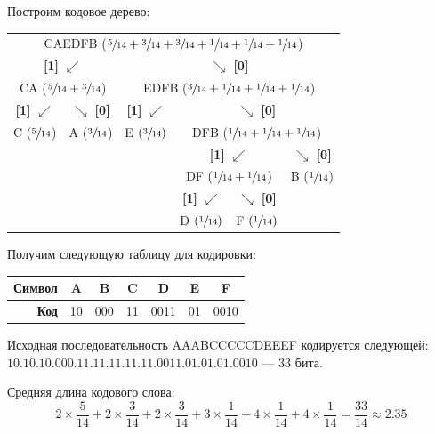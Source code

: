 \begin{example}
    Построим кодовое дерево:
    \begin{table}[H]
        \centering
        \begin{tabular}{cccccc}
        \multicolumn{6}{c}{CAEDFB ($\sfrac{5}{14} + \sfrac{3}{14} + \sfrac{3}{14} + \sfrac{1}{14} + \sfrac{1}{14} + \sfrac{1}{14}$)} \\
        \multicolumn{2}{c}{\textbf{[1]} $\swarrow$} & \multicolumn{4}{c}{$\searrow$ \textbf{[0]}} \\
        \multicolumn{2}{c}{CA ($\sfrac{5}{14} + \sfrac{3}{14}$)} & \multicolumn{4}{c}{EDFB ($\sfrac{3}{14} + \sfrac{1}{14} + \sfrac{1}{14} + \sfrac{1}{14}$)} \\
        \textbf{[1]} $\swarrow$ & $\searrow$ \textbf{[0]} & \textbf{[1]} $\swarrow$ & \multicolumn{3}{c}{$\searrow$ \textbf{[0]}} \\
        C ($\sfrac{5}{14}$) & A ($\sfrac{3}{14}$) & E $(\sfrac{3}{14})$ & \multicolumn{3}{c}{DFB ($\sfrac{1}{14} + \sfrac{1}{14} + \sfrac{1}{14}$)} \\
        & & & \multicolumn{2}{c}{\textbf{[1]} $\swarrow$} & $\searrow$ \textbf{[0]} \\
        & & & \multicolumn{2}{c}{DF ($\sfrac{1}{14} + \sfrac{1}{14}$)} & B ($\sfrac{1}{14}$) \\
        & & & \textbf{[1]} $\swarrow$ & $\searrow$ \textbf{[0]} & \\
        & & & D $(\sfrac{1}{14})$ & F $(\sfrac{1}{14})$ & \\
        \end{tabular}
    \end{table}

    Получим следующую таблицу для кодировки:

    \begin{table}[H]
        \centering
        \begin{tabularx}{0.7\linewidth}{|r|C|C|C|C|C|C|}
            \hline
            \textbf{Символ} & A  & B & C & D & E & F \\ \hline
            \textbf{Код}    & 10 & 000 & 11 & 0011 & 01 & 0010 \\ \hline
        \end{tabularx}
    \end{table}

    \answer%
    Исходная последовательность AAABCCCCCDEEEF кодируется следующей: $10.10.10.000.11.11.11.11.11.0011.01.01.01.0010$ --- 33 бита.

    Средняя длина кодового слова:
    \[
        2 \times \frac{5}{14} + 2 \times \frac{3}{14} + 2 \times \frac{3}{14} + 3 \times \frac{1}{14} + 4 \times \frac{1}{14} + 4 \times \frac{1}{14} = \frac{33}{14} \approx \num{2.35}
    \]
\end{example}

